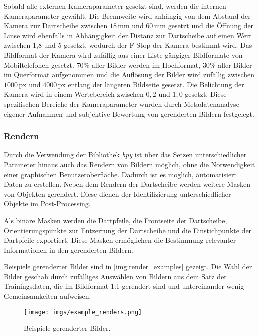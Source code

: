 Sobald alle externen Kameraparameter gesetzt sind, werden die internen Kameraparameter gewählt. Die Brennweite wird anhängig von dem Abstand der Kamera zur Dartscheibe zwischen $18\,\text{mm}$ und $60\,\text{mm}$ gesetzt und die Öffnung der Linse wird ebenfalls in Abhängigkeit der Distanz zur Dartscheibe auf einen Wert zwischen 1,8 und 5 gesetzt, wodurch der F-Stop der Kamera bestimmt wird. Das Bildformat der Kamera wird zufällig aus einer Liste gängiger Bildformate von Mobiltelefonen gesetzt. $70\%$ aller Bilder werden im Hochformat, $30\%$ aller Bilder im Querformat aufgenommen und die Auflösung der Bilder wird zufällig zwischen $1000\,\text{px}$ und $4000\,\text{px}$ entlang der längeren Bildseite gesetzt. Die Belichtung der Kamera wird in einem Wertebereich zwischen $0,2$ und $1,0$ gesetzt. Diese spezifischen Bereiche der Kameraparameter wurden durch Metadatenanalyse eigener Aufnahmen und subjektive Bewertung von gerenderten Bildern festgelegt.


\subsubsection{Rendern}
\label{sec:impl:daten:python:render}

Durch die Verwendung der Bibliothek \textit{bpy} ist über das Setzen unterschiedlicher Parameter hinaus auch das Rendern von Bildern möglich, ohne die Notwendigkeit einer graphischen Benutzeroberfläche. Dadurch ist es möglich, automatisiert Daten zu erstellen. Neben dem Rendern der Dartscheibe werden weitere Masken von Objekten gerendert. Diese dienen der Identifizierung unterschiedlicher Objekte im Post-Processing.

Als binäre Masken werden die Dartpfeile, die Frontseite der Dartscheibe, Orientierungspunkte zur Entzerrung der Dartscheibe und die Einstichpunkte der Dartpfeile exportiert. Diese Masken ermöglichen die Bestimmung relevanter Informationen in den gerenderten Bildern.

Beispiele gerenderter Bilder sind in \autoref{img:render_examples} gezeigt. Die Wahl der Bilder geschah durch zufälliges Auswählen von Bildern aus dem Satz der Trainingsdaten, die im Bildformat 1:1 gerendert sind und untereinander wenig Gemeinsamkeiten aufweisen.

\begin{figure}
    \centering
    \texttt{[image: imgs/example\_renders.png]}
    \caption{Beispiele gerenderter Bilder.}
    \label{img:render_examples}
\end{figure}

